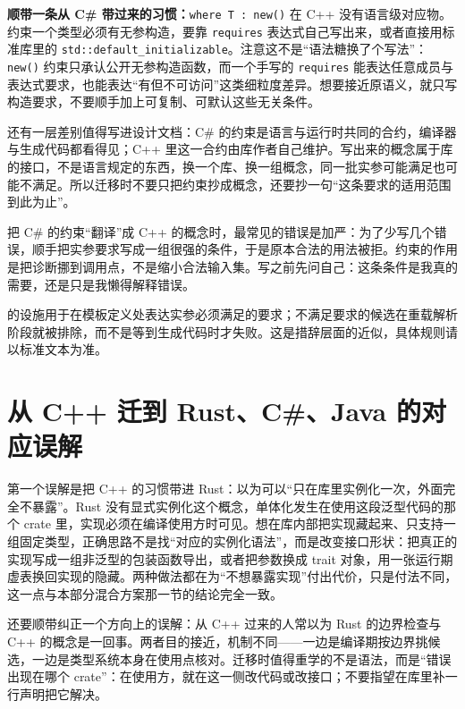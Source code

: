 \documentclass[12pt,a4paper,fontset=fandol]{ctexbook}
\newcommand{\cppxxlabel}[1]{%
  \tcbox[on line,colback=cpp20bg,colframe=cpp20bg,
    boxrule=0pt,arc=1pt,left=2pt,right=2pt,top=1pt,bottom=1pt,
    colupper=white,fontupper=\scriptsize\bfseries]{#1}}
\newcommand{\kw}[1]{\texttt{#1}}
\begin{document}
\textbf{顺带一条从 C\# 带过来的习惯：}\kw{where T : new()} 在 C++ 没有语言级对应物。约束一个类型必须有无参构造，要靠 \kw{requires} 表达式自己写出来，或者直接用标准库里的 \kw{std::default\_initializable}\allowbreak{}。注意这不是“语法糖换了个写法”：\kw{new()}\allowbreak{} 约束只承认公开无参构造函数，而一个手写的 \kw{requires}\allowbreak{} 能表达任意成员与表达式要求，也能表达“有但不可访问”这类细粒度差异。想要接近原语义，就只写构造要求，不要顺手加上可复制、可默认这些无关条件。

还有一层差别值得写进设计文档：C\# 的约束是语言与运行时共同的合约，编译器与生成代码都看得见；C++ 里这一合约由库作者自己维护。写出来的概念属于库的接口，不是语言规定的东西，换一个库、换一组概念，同一批实参可能满足也可能不满足。所以迁移时不要只把约束抄成概念，还要抄一句“这条要求的适用范围到此为止”。

\begin{warning}[title={约束不是可选的装饰}]
把 C\# 的约束“翻译”成 C++ 的概念时，最常见的错误是加严：为了少写几个错误，顺手把实参要求写成一组很强的条件，于是原本合法的用法被拒。约束的作用是把诊断挪到调用点，不是缩小合法输入集。写之前先问自己：这条条件是我真的需要，还是只是我懒得解释错误。
\end{warning}

\begin{stdbox}[title={概念的定位}]
\cppxxlabel{C++20} 的设施用于在模板定义处表达实参必须满足的要求；不满足要求的候选在重载解析阶段就被排除，而不是等到生成代码时才失败。这是措辞层面的近似，具体规则请以标准文本为准。
\end{stdbox}

\section{从 C++ 迁到 Rust、C\#、Java 的对应误解}

第一个误解是把 C++ 的习惯带进 Rust：以为可以“只在库里实例化一次，外面完全不暴露”。Rust 没有显式实例化这个概念，单体化发生在使用这段泛型代码的那个 crate 里，实现必须在编译使用方时可见。想在库内部把实现藏起来、只支持一组固定类型，正确思路不是找“对应的实例化语法”，而是改变接口形状：把真正的实现写成一组非泛型的包装函数导出，或者把参数换成 trait 对象，用一张运行期虚表换回实现的隐藏。两种做法都在为“不想暴露实现”付出代价，只是付法不同，这一点与本部分混合方案那一节的结论完全一致。

还要顺带纠正一个方向上的误解：从 C++ 过来的人常以为 Rust 的边界检查与 C++ 的概念是一回事。两者目的接近，机制不同——一边是编译期按边界挑候选，一边是类型系统本身在使用点核对。迁移时值得重学的不是语法，而是“错误出现在哪个 crate”：在使用方，就在这一侧改代码或改接口；不要指望在库里补一行声明把它解决。
\end{document}

